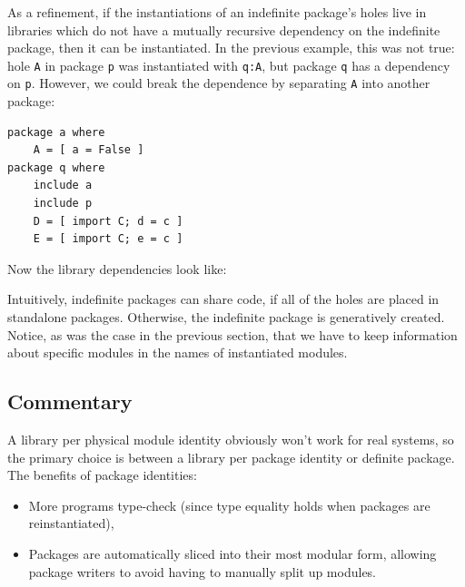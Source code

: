 \documentclass{article}
\begin{document}
As a refinement, if the instantiations of an indefinite package's holes
live in libraries which do not have a mutually recursive dependency on
the indefinite package, then it can be instantiated.  In the previous
example, this was not true: hole \verb|A| in package \verb|p| was
instantiated with \verb|q:A|, but package \verb|q| has a dependency
on \verb|p|.  However, we could break the dependence by separating \verb|A|
into another package:

\begin{verbatim}
package a where
    A = [ a = False ]
package q where
    include a
    include p
    D = [ import C; d = c ]
    E = [ import C; e = c ]
\end{verbatim}

Now the library dependencies look like: \\


Intuitively, indefinite packages can share code, if all of the holes are
placed in standalone packages.  Otherwise, the indefinite package is
generatively created.  Notice, as was the case in the previous section,
that we have to keep information about specific modules in the names
of instantiated modules.

\subsection{Commentary}

A library per physical module identity obviously won't work for real systems,
so the primary choice is between a library per package identity or
definite package.  The benefits of package identities:

\begin{itemize}
    \item More programs type-check (since type equality holds when packages
        are reinstantiated),
    \item Packages are automatically sliced into their most modular form,
        allowing package writers to avoid having to manually split up modules.
\end{itemize}
\end{document}
